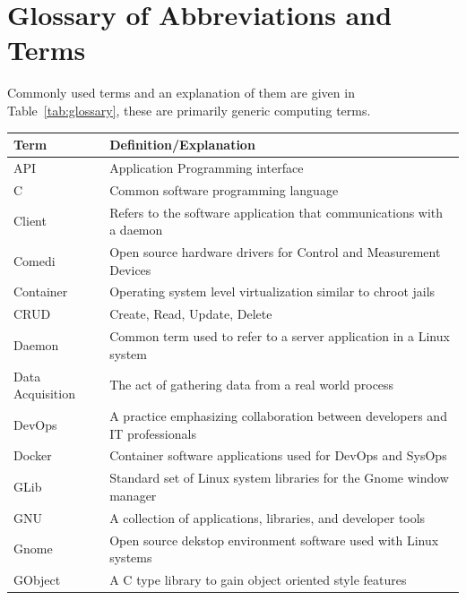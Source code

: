 \documentclass[11pt]{article}
\begin{document}
  \newpage
  \printbibliography%

  \newpage
  \addappheadtotoc%
  \appendix
  \appendixpage%

  \section{Glossary of Abbreviations and Terms}\label{app:glossary}

    Commonly used terms and an explanation of them are given in
    Table~\ref{tab:glossary}, these are primarily generic computing terms.

    \begin{table}[H]
      \centering
      \begin{tabular}{l | p{10cm}}
        \toprule
        Term & Definition/Explanation \\ [0.5ex]
        \midrule
        API & Application Programming interface \\
        C & Common software programming language \\
        Client & Refers to the software application that communications with a daemon \\
        Comedi & Open source hardware drivers for Control and Measurement Devices \\
        Container & Operating system level virtualization similar to chroot jails \\
        CRUD & Create, Read, Update, Delete \\
        Daemon & Common term used to refer to a server application in a Linux system \\
        Data Acquisition & The act of gathering data from a real world process \\
        DevOps & A practice emphasizing collaboration between developers and IT professionals \\
        Docker & Container software applications used for DevOps and SysOps \\
        GLib & Standard set of Linux system libraries for the Gnome window manager \\
        GNU & A collection of applications, libraries, and developer tools \\
        Gnome & Open source dekstop environment software used with Linux systems \\
        GObject & A C type library to gain object oriented style features \\

\end{tabular}
\end{table}
\end{document}
